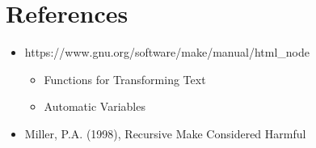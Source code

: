 \section{References}

\begin{frame}{\secname}
    \small
    \begin{itemize}
        \item https://www.gnu.org/software/make/manual/html\_node
        \begin{itemize}
            \item Functions for Transforming Text
            \item Automatic Variables
        \end{itemize}
        \item Miller, P.A. (1998), Recursive Make Considered Harmful
    \end{itemize}
    \normalsize
\end{frame}

